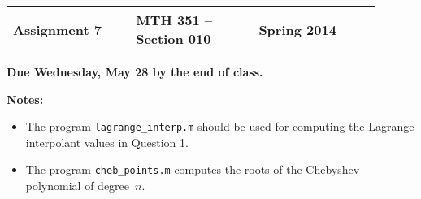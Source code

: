 \documentclass{article}
\newcommand{\myspace}{0.4cm}
\begin{document}
\begin{center}

\large
\begin{tabular}{L{0.3\linewidth} C{0.3\linewidth} R{0.3\linewidth}}
\hline
Assignment 7	&MTH 351 -- Section 010		&Spring 2014 \\
\hline
\end{tabular}

\vspace{\myspace}

{\bf Due Wednesday, May 28 by the end of class.}
\end{center}

{\bf Notes:} 
\begin{itemize}
\itemsep0em 
\item The program {\tt lagrange\_interp.m} should be used for computing  the Lagrange interpolant values in Question 1. 
\item The program {\tt cheb\_points.m} computes the roots of the Chebyshev polynomial of degree~$n$. 
\end{itemize}
\end{document}
